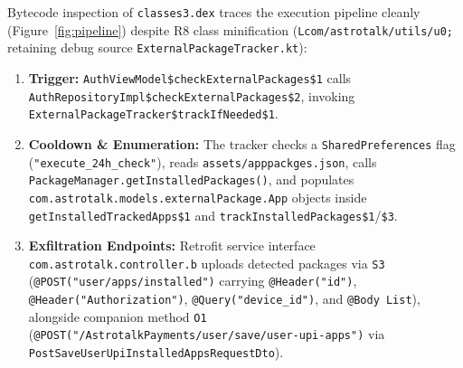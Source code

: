 Bytecode inspection of \texttt{classes3.dex} traces the execution pipeline cleanly (Figure~\ref{fig:pipeline}) despite R8 class minification (\nolinkurl{Lcom/astrotalk/utils/u0;} retaining debug source \texttt{ExternalPackageTracker.kt}):
\begin{enumerate}[leftmargin=*,itemsep=2pt,topsep=3pt]
\item \textbf{Trigger:} \texttt{AuthViewModel\$\allowbreak check\allowbreak External\allowbreak Packages\$1} calls \texttt{AuthRepositoryImpl\$\allowbreak check\allowbreak External\allowbreak Packages\$2}, invoking \texttt{External\allowbreak Package\allowbreak Tracker\$\allowbreak trackIfNeeded\$1}.
\item \textbf{Cooldown \& Enumeration:} The tracker checks a \texttt{SharedPreferences} flag (\texttt{"execute\_24h\_check"}), reads \nolinkurl{assets/apppackges.json}, calls \nolinkurl{PackageManager.getInstalledPackages()}, and populates \nolinkurl{com.astrotalk.models.externalPackage.App} objects inside \texttt{getInstalledTrackedApps\$1} and \texttt{trackInstalledPackages\$1}/\texttt{\$3}.
\item \textbf{Exfiltration Endpoints:} Retrofit service interface \nolinkurl{com.astrotalk.controller.b} uploads detected packages via \texttt{S3} (\nolinkurl{@POST("user/apps/installed")} carrying \texttt{@Header("id")}, \texttt{@Header("Authorization")}, \texttt{@Query("device\_id")}, and \texttt{@Body List}), alongside companion method \texttt{O1} (\nolinkurl{@POST("/AstrotalkPayments/user/save/user-upi-apps")} via \texttt{PostSaveUser\allowbreak UpiInstalled\allowbreak AppsRequestDto}).
\end{enumerate}

